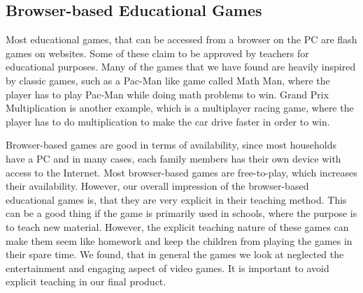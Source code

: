 \subsection{Browser-based Educational Games}
Most educational games, that can be accessed from a browser on the PC are flash games on websites.
Some of these claim to be approved by teachers for educational purposes.
Many of the games that we have found are heavily inspired by classic games, such as a Pac-Man like game called Math Man, where the player has to play Pac-Man while doing math problems to win.\cite{mathman}
Grand Prix Multiplication is another example, which is a multiplayer racing game, where the player has to do multiplication to make the car drive faster in order to win.\cite{grandprix}\newline

Browser-based games are good in terms of availability, since most households have a PC and in many cases, each family members has their own device with access to the Internet. Most browser-based games are free-to-play, which increases their availability. However, our overall impression of the browser-based educational games is, that they are very explicit in their teaching method. This can be a good thing if the game is primarily used in schools, where the purpose is to teach new material. However, the explicit teaching nature of these games can make them seem like homework and keep the children from playing the games in their spare time. We found, that in general the games we look at neglected the entertainment and engaging aspect of video games. It is important to avoid explicit teaching in our final product.